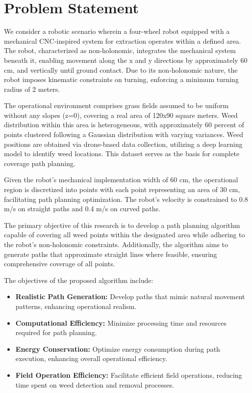 \section{Problem Statement}

We consider a robotic scenario wherein a four-wheel robot equipped with a mechanical CNC-inspired system for extraction operates within a defined area. The robot, characterized as non-holonomic, integrates the mechanical system beneath it, enabling movement along the x and y directions by approximately 60 cm, and vertically until ground contact. Due to its non-holonomic nature, the robot imposes kinematic constraints on turning, enforcing a minimum turning radius of 2 meters.

\vspace*{6mm} 


The operational environment comprises grass fields assumed to be uniform without any slopes (z=0), covering a real area of 120x90 square meters. Weed distribution within this area is heterogeneous, with approximately 60 percent of points clustered following a Gaussian distribution with varying variances. Weed positions are obtained via drone-based data collection, utilizing a deep learning model to identify weed locations. This dataset serves as the basis for complete coverage path planning.

\vspace*{6mm} 


Given the robot's mechanical implementation width of 60 cm, the operational region is discretized into points with each point representing an area of 30 cm, facilitating path planning optimization. The robot's velocity is constrained to 0.8 m/s on straight paths and 0.4 m/s on curved paths.

\vspace*{6mm} 


The primary objective of this research is to develop a path planning algorithm capable of covering all weed points within the designated area while adhering to the robot's non-holonomic constraints. Additionally, the algorithm aims to generate paths that approximate straight lines where feasible, ensuring comprehensive coverage of all points.

\vspace*{6mm} 

The objectives of the proposed algorithm include:

\begin{itemize}
    \item \textbf{Realistic Path Generation:} Develop paths that mimic natural movement patterns, enhancing operational realism.
    \item  \textbf{Computational Efficiency:} Minimize processing time and resources required for path planning.
    \item  \textbf{Energy Conservation:} Optimize energy consumption during path execution, enhancing overall operational efficiency.
    \item  \textbf{Field Operation Efficiency:} Facilitate efficient field operations, reducing time spent on weed detection and removal processes.
\end{itemize}


